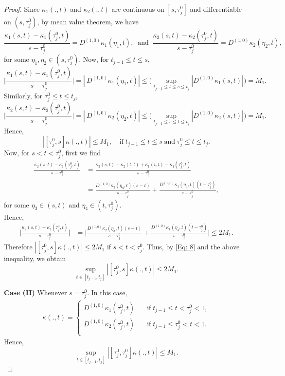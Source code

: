 \documentclass[sn-mathphys-num]{sn-jnl}%
\theoremstyle{thmstyleone}%
\theoremstyle{thmstyletwo}%
\theoremstyle{thmstylethree}%
\begin{document}
\begin{proof}
	Since $\kappa_1(.,t)$ and $\kappa_2(.,t)$ are continuous on $[s, \tau_j^0]$ and differentiable on $(s, \tau_j^0)$, by mean value theorem, we have
	$$
	\frac{\kappa_1(s,t)-\kappa_1(\tau_j^0,t)}{s-\tau_j^0} = D^{(1,0)}\kappa_1(\eta_1,t), \;\; \text{and} \;\; \frac{\kappa_2(s,t)-\kappa_2(\tau_j^0,t)}{s-\tau_j^0} = D^{(1,0)}\kappa_2(\eta_2,t),
	$$
	for some $\eta_1, \eta_2 \in (s, \tau_j^0).$
	Now, for $t_{j-1} \le t \le s$,
	$$
	\bigg | \frac{\kappa_1(s,t)-\kappa_1(\tau_j^0,t)}{s-\tau_j^0} \bigg| = \left| \ D^{(1,0)}\kappa_1(\eta_1,t)\right | \le \bigg (\sup_{t_{j-1} \le t \le s \le t_j} \left| D^{(1,0)} \kappa_1(s,t)\right| \bigg ) = M_1. 
	$$
	Similarly, for $\tau_j^0 \le t \le t_j$,
	$$
	\bigg | \frac{\kappa_2(s,t)-\kappa_2(\tau_j^0,t)}{s-\tau_j^0} \bigg| = \left| \ D^{(1,0)}\kappa_2(\eta_2,t)\right | \le \bigg (\sup_{t_{j-1} \le s \le t \le t_j} \left| D^{(1,0)} \kappa_2(s,t)\right| \bigg ) = M_1. 
	$$
	Hence, 
	\begin{equation}\label{Eq: 8}
		\left|[\tau_j^0,s]\kappa(.,t)\right| \le M_1, ~ \; \;\; \text{if} \; t_{j-1} \le t \le s \; \text{and} \; \tau_j^0 \le t \le t_j.
	\end{equation}
	Now, for $s < t < \tau_j^0$, first we find
	\begin{align*}
		\frac{\kappa_2(s,t)-\kappa_1(\tau_j^0,t)}{s-\tau_j^0} &= \frac{\kappa_2(s,t)-\kappa_2(t,t)+\kappa_1(t,t)-\kappa_1(\tau_j^0,t)}{s-\tau_j^0} \\
		&= \frac{D^{(1,0)}\kappa_2(\eta_3,t)(s-t)}{s-\tau_j^0}+\frac{D^{(1,0)}\kappa_1(\eta_4,t)(t-\tau_j^0)}{s-\tau_j^0},
	\end{align*}
	for some $\eta_3 \in (s,t)$ and $\eta_4 \in (t, \tau_j^0).$\\
	Hence, 
	\begin{align*}
		\bigg | \frac{\kappa_2(s,t)-\kappa_1(\tau_j^0,t)}{s-\tau_j^0} \bigg| &= \bigg| \frac{D^{(1,0)}\kappa_2(\eta_3,t)(s-t)}{s-\tau_j^0}+\frac{D^{(1,0)}\kappa_1(\eta_4,t)(t-\tau_j^0)}{s-\tau_j^0}\bigg| \nonumber \leq 2M_1.
	\end{align*}
	Therefore $\displaystyle{\left|[\tau_j^0,s]\kappa(.,t)\right| \le 2M_1}$ if $ s < t < \tau_j^0 $.
	Thus, by \eqref{Eq: 8} and the above inequality, we obtain
	\begin{equation}\label{Eq: 9}
		\sup_{t \in [t_{j-1},t_j]}\left|[\tau_j^0,s]\kappa(.,t)\right| \le 2M_1.
	\end{equation}
	
	\noindent	
	\textbf{Case (II)}
	Whenever $s = \tau_j^0$. In this case,
	\begin{align*}
		[\tau_j^0,\tau_j^0] \kappa(.,t) = \begin{cases}
			D^{(1,0)}\kappa_1(\tau_j^0,t)  \quad &\text{if}\; t_{j-1} \le t < \tau_j^0 < 1,\\
			D^{(1,0)}\kappa_2(\tau_j^0,t)  \quad &\text{if}\; t_{j-1} \le \tau_j^0 < t  < 1.\\	
		\end{cases} 
	\end{align*}
	Hence, 
	\begin{equation}\label{Eq: 10}
		\sup_{t \in [t_{j-1},t_j]}\left|[\tau_j^0,\tau_j^0]\kappa(.,t)\right| \le M_1.
	\end{equation}
	

\end{proof}
\end{document}
